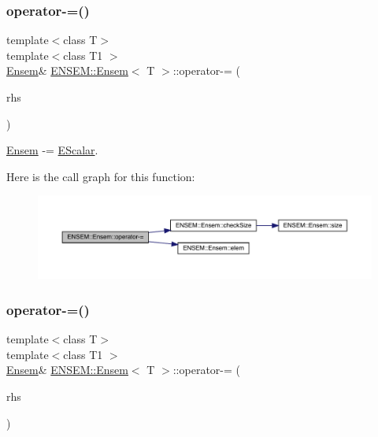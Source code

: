 \subsubsection{\texorpdfstring{operator-\/=()}{operator-=()}\hspace{0.1cm}{\footnotesize\ttfamily [2/4]}}
{\footnotesize\ttfamily template$<$class T$>$ \\
template$<$class T1 $>$ \\
\mbox{\hyperlink{classENSEM_1_1Ensem}{Ensem}}\& \mbox{\hyperlink{classENSEM_1_1Ensem}{E\+N\+S\+E\+M\+::\+Ensem}}$<$ T $>$\+::operator-\/= (\begin{DoxyParamCaption}\item[{const \mbox{\hyperlink{classENSEM_1_1EScalar}{E\+Scalar}}$<$ T1 $>$ \&}]{rhs }\end{DoxyParamCaption})\hspace{0.3cm}{\ttfamily [inline]}}



\mbox{\hyperlink{classENSEM_1_1Ensem}{Ensem}} -\/= \mbox{\hyperlink{classENSEM_1_1EScalar}{E\+Scalar}}. 

Here is the call graph for this function\+:
\nopagebreak
\begin{figure}[H]
\begin{center}
\leavevmode
\includegraphics[width=350pt]{d7/d3e/classENSEM_1_1Ensem_a33710df08404883ee7790d2b67542971_cgraph}
\end{center}
\end{figure}
\mbox{\label{classENSEM_1_1Ensem_ae3f3e36d96a4600e56c2b139e7897186}} 
\subsubsection{\texorpdfstring{operator-\/=()}{operator-=()}\hspace{0.1cm}{\footnotesize\ttfamily [3/4]}}
{\footnotesize\ttfamily template$<$class T$>$ \\
template$<$class T1 $>$ \\
\mbox{\hyperlink{classENSEM_1_1Ensem}{Ensem}}\& \mbox{\hyperlink{classENSEM_1_1Ensem}{E\+N\+S\+E\+M\+::\+Ensem}}$<$ T $>$\+::operator-\/= (\begin{DoxyParamCaption}\item[{const \mbox{\hyperlink{classENSEM_1_1Ensem}{Ensem}}$<$ T1 $>$ \&}]{rhs }\end{DoxyParamCaption})\hspace{0.3cm}{\ttfamily [inline]}}



